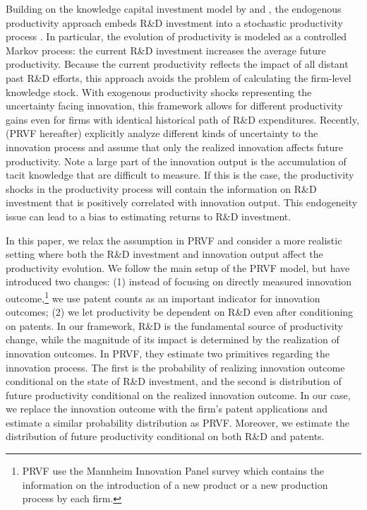 \documentclass[11pt]{article}
\begin{document}
Building on the knowledge capital investment model by \cite{hall1989research} and \cite{klette1996r}, the endogenous productivity approach embeds R\&D investment into a stochastic productivity process \citep{Awetal.2011, Doraszelski2013, Peters2017rand}. In particular, the evolution of productivity is modeled as a controlled Markov process: the current R\&D investment increases the average future productivity. Because the current productivity reflects the impact of all distant past R\&D efforts, this approach avoids the problem of calculating the firm-level knowledge stock. With exogenous productivity shocks representing the uncertainty facing innovation, this framework allows for different productivity gains even for firms with identical historical path of R\&D expenditures. Recently, \cite{Peters2017rand} (PRVF hereafter) explicitly analyze different kinds of uncertainty to the innovation process and assume that only the realized innovation affects future productivity. Note a large part of the innovation output is the accumulation of tacit knowledge that are difficult to measure. If this is the case, the productivity shocks in the productivity process will contain the information on R\&D investment that is positively correlated with innovation output. This endogeneity issue can lead to a bias to estimating returns to R\&D investment. 

In this paper, we relax the assumption in PRVF and consider a more realistic setting where both the R\&D investment and innovation output affect the productivity evolution. We follow the main setup of the PRVF model, but have introduced two changes: (1) instead of focusing on directly measured innovation outcome,\footnote{PRVF use the Mannheim Innovation Panel survey which contains the information on the introduction of a new product or a new production process by each firm.} we use patent counts as an important indicator for innovation outcomes; (2) we let productivity be dependent on R\&D even after conditioning on patents. In our framework, R\&D is the fundamental source of productivity change, while the magnitude of its impact is determined by the realization of innovation outcomes. In PRVF, they estimate two primitives regarding the innovation process. The first is the probability of realizing innovation outcome conditional on the state of R\&D investment, and the second is distribution of future productivity conditional on the realized innovation outcome. In our case, we replace the innovation outcome with the firm's patent applications and estimate a similar probability distribution as PRVF.  Moreover, we estimate the distribution of future productivity conditional on both R\&D and patents.
\end{document}
